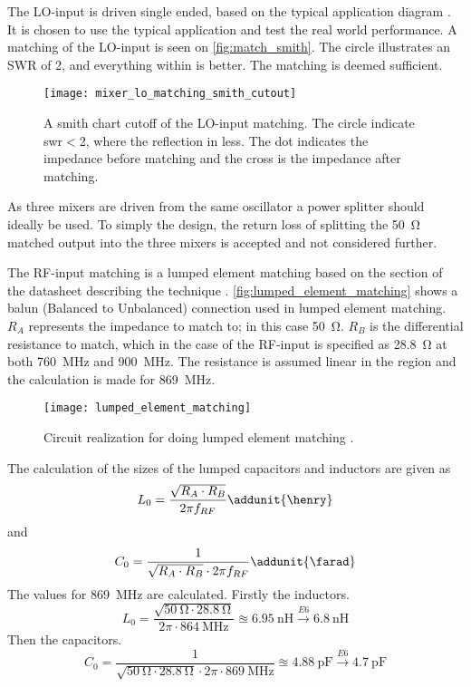 The LO-input is driven single ended, based on the typical application diagram \citep{datasheet:LT5560}. It is chosen to use the typical application and test the real world performance. A matching of the LO-input is seen on \autoref{fig:match_smith}. The circle illustrates an SWR of 2, and everything within is better. The matching is deemed sufficient.

\begin{figure} [h]
\centering
\texttt{[image: mixer\_lo\_matching\_smith\_cutout]}
\caption{A smith chart cutoff of the LO-input matching. The circle indicate \gls{swr}$<$2, where the reflection in less. The dot indicates the impedance before matching and the cross is the impedance after matching.}
\label{fig:match_smith}
\end{figure}

As three mixers are driven from the same oscillator a power splitter should ideally be used. To simply the design, the return loss of splitting the \SI{50}{\ohm} matched output into the three mixers is accepted and not considered further.

The RF-input matching is a lumped element matching based on the section of the datasheet describing the technique \citep{datasheet:LT5560}. \autoref{fig:lumped_element_matching} shows a balun (Balanced to Unbalanced) connection used in lumped element matching. $R_A$ represents the impedance to match to; in this case \SI{50}{\ohm}. $R_B$ is the differential resistance to match, which in the case of the RF-input is specified as \SI{28,8}{\ohm} at both \SI{760}{\mega\hertz} and \SI{900}{\mega\hertz}. The resistance is assumed linear in the region and the calculation is made for \SI{869}{\mega\hertz}.

\begin{figure} [h]
	\centering
	\texttt{[image: lumped\_element\_matching]}
	\caption{Circuit realization for doing lumped element matching \citep{datasheet:LT5560}.}
	\label{fig:lumped_element_matching}
\end{figure}

The calculation of the sizes of the lumped capacitors and inductors are given as
\begin{equation}
	L_0 = \frac{\sqrt{R_A \cdot R_B}}{2\pi f_{RF}} \addunit{\henry}
\end{equation}
and
\begin{equation}
	C_0 = \frac{1}{\sqrt{R_A \cdot R_B} \cdot 2\pi f_{RF}} \addunit{\farad}
\end{equation}
The values for \SI{869}{\mega\hertz} are calculated. Firstly the inductors.
\begin{equation}
	L_0 = \frac{\sqrt{\SI{50}{\ohm} \cdot \SI{28.8}{\ohm}}}{2\pi \cdot \SI{864}{\mega\hertz}} \approxeq \SI{6,95}{\nano\henry} \xrightarrow{E6} \SI{6,8}{\nano\henry}
\end{equation}
Then the capacitors.
\begin{equation}
C_0 = \frac{1}{\sqrt{\SI{50}{\ohm} \cdot \SI{28.8}{\ohm}} \cdot 2\pi \cdot \SI{869}{\mega\hertz}} \approxeq \SI{4.88}{\pico\farad} \xrightarrow{E6} \SI{4,7}{\pico\farad}
\end{equation}


